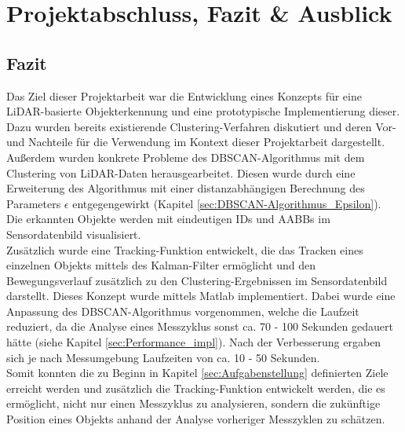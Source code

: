 
\chapter{Projektabschluss, Fazit \& Ausblick}\label{cha:Schlussbetrachtung}
\section{Fazit}\label{sec:Fazit}
Das Ziel dieser Projektarbeit war die Entwicklung eines Konzepts für eine \ac{LiDAR}-basierte Objekterkennung und eine prototypische Implementierung dieser.
Dazu wurden bereits existierende Clustering-Verfahren diskutiert und deren Vor- und Nachteile für die Verwendung im Kontext dieser Projektarbeit dargestellt. Außerdem wurden konkrete Probleme des \ac{DBSCAN}-Algorithmus mit dem Clustering von \ac{LiDAR}-Daten herausgearbeitet. Diesen wurde durch eine Erweiterung des Algorithmus mit einer distanzabhängigen Berechnung des Parameters $\epsilon$ entgegengewirkt (Kapitel \ref{sec:DBSCAN-Algorithmus_Epsilon}).\\
Die erkannten Objekte werden mit eindeutigen IDs und \ac{AABB}s im Sensordatenbild visualisiert.\\
Zusätzlich wurde eine Tracking-Funktion entwickelt, die das Tracken eines einzelnen Objekts mittels des Kalman-Filter ermöglicht und den Bewegungsverlauf zusätzlich zu den Clustering-Ergebnissen im Sensordatenbild darstellt.
Dieses Konzept wurde mittels Matlab implementiert. Dabei wurde eine Anpassung des \ac{DBSCAN}-Algorithmus vorgenommen, welche die Laufzeit reduziert, da die Analyse eines Messzyklus sonst ca. 70 - 100 Sekunden gedauert hätte (siehe Kapitel \ref{sec:Performance_impl}). Nach der Verbesserung ergaben sich je nach Messumgebung Laufzeiten von ca. 10 - 50 Sekunden.\\
Somit konnten die zu Beginn in Kapitel \ref{sec:Aufgabenstellung} definierten Ziele erreicht werden und zusätzlich die Tracking-Funktion entwickelt werden, die es ermöglicht, nicht nur einen Messzyklus zu analysieren, sondern die zukünftige Position eines Objekts anhand der Analyse vorheriger Messzyklen zu schätzen.
